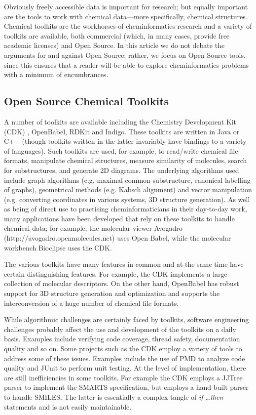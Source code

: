 \documentclass{sig-alternate}
\begin{document}
Obviously freely accessible data is important for research; but
equally important are the tools to work with chemical data---more
specifically, chemical structures. Chemical toolkits are the workhorses
of cheminformatics research and a variety of toolkits are available,
both commercial (which, in many cases, provide free academic
licenses) and Open Source. In this article we do not debate the
arguments for and against Open Source; rather, we focus on Open Source
tools, since this ensures that a reader will be able to explore
cheminformatics problems with a minimum of encumbrances.

\subsection{Open Source Chemical Toolkits}

A number of toolkits are available including the Chemistry Development
Kit (CDK) \cite{steinbeck2003}, OpenBabel, RDKit and Indigo. These toolkits are written in
Java or C++ (though toolkits written in the latter invariably have
bindings to a variety of languages). Such toolkits are used, for
example, to read/write chemical file formats, manipulate chemical
structures, measure similarity of molecules, search for substructures,
and generate 2D diagrams. The underlying algorithms used include graph
algorithms (e.g. maximal common substructure, canonical labelling of
graphs), geometrical methods (e.g. Kabsch alignment) and vector
manipulation (e.g. converting coordinates in various systems, 3D
structure generation). As well as being of direct use to practising
cheminformaticians in their day-to-day work, many applications have
been developed that rely on these toolkits to handle chemical data;
for example, the molecular viewer Avogadro
(http://avogadro.openmolecules.net) uses Open Babel, while the
molecular workbench Bioclipse \cite{Bioclipse2} uses the CDK.

The various toolkits have many features in common and at the same time
have certain distinguishing features. For example, the CDK implements
a large collection of molecular descriptors. On the other hand,
OpenBabel has robust support for 3D structure generation and
optimization and supports the interconversion of a huge number of
chemical file formats.

While algorithmic challenges are certainly faced by toolkits, software
engineering challenges probably affect the use and development of the
toolkits on a daily basis. Examples include verifying code coverage,
thread safety, documentation quality and so on. Some projects such as
the CDK employ a variety of tools to address some of these issues.
Examples include the use of PMD to analyze code quality and JUnit to
perform unit testing. At the level of implementation, there are still
inefficiencies in some toolkits. For example the CDK employs a JJTree
parser to implement the SMARTS specification, but employs a hand built
parser to handle SMILES. The latter is essentially a complex tangle of
\emph{if \ldots then} statements and is not easily maintainable.
\end{document}
